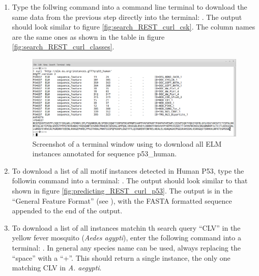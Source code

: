 \begin{enumerate}
\item Type the follwing command into a command line terminal to
	download the same data from the previous step directly into the
	terminal:
	.  The output
	should look similar to figure \ref{fig:search_REST_curl_csk}.
	The column names are the same ones as shown in the
	table in figure \ref{fig:search_REST_curl_classes}.


\begin{figure}[h!]
	\centering
	\includegraphics[width=\textwidth]{Figures/search_REST/elm_curl_instances_p53_human.png}
	\caption{
	Screenshot of a terminal window using  to download all ELM
	instances annotated for sequence p53\_human.
	}
	\label{fig:search_REST_curl_p53}
\end{figure}

\item To download a list of all motif instances detected in Human P53, type the
	followin command into a terminal: . The output should look
	similar to that shown in figure \ref{fig:predicting_REST_curl_p53}. The
	output is in the ``General Feature Format''
	(see ),
	with the FASTA formatted sequence appended to the end of the output.  



\item To download a list of all instances matchin th search query ``CLV'' in
	the yellow fever mosquito (\textit{Aedes agypti}), enter the following
	command into a terminal:
	.
	In general any species name can be used, always replacing the ``space''
	with a ``+''. This should return a single instance, the only one
	matching CLV in \textit{A. aegypti}.


\end{enumerate}
